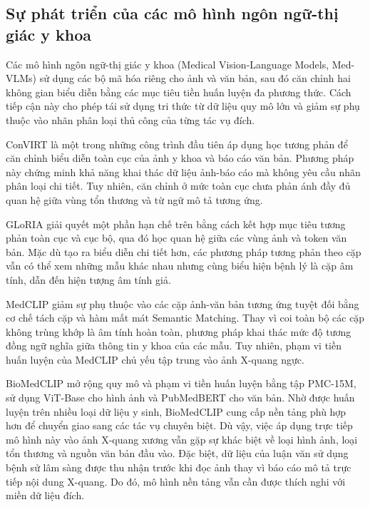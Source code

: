\subsection{Sự phát triển của các mô hình ngôn ngữ-thị giác y khoa}
\label{subsec:med_vlm_progress}

Các mô hình ngôn ngữ-thị giác y khoa (Medical Vision-Language Models, Med-VLMs) sử dụng các bộ mã hóa riêng cho ảnh và văn bản, sau đó căn chỉnh hai không gian biểu diễn bằng các mục tiêu tiền huấn luyện đa phương thức. Cách tiếp cận này cho phép tái sử dụng tri thức từ dữ liệu quy mô lớn và giảm sự phụ thuộc vào nhãn phân loại thủ công của từng tác vụ đích.

ConVIRT \cite{ConVIRT} là một trong những công trình đầu tiên áp dụng học tương phản để căn chỉnh biểu diễn toàn cục của ảnh y khoa và báo cáo văn bản. Phương pháp này chứng minh khả năng khai thác dữ liệu ảnh-báo cáo mà không yêu cầu nhãn phân loại chi tiết. Tuy nhiên, căn chỉnh ở mức toàn cục chưa phản ánh đầy đủ quan hệ giữa vùng tổn thương và từ ngữ mô tả tương ứng.

GLoRIA \cite{GLoRIA} giải quyết một phần hạn chế trên bằng cách kết hợp mục tiêu tương phản toàn cục và cục bộ, qua đó học quan hệ giữa các vùng ảnh và token văn bản. Mặc dù tạo ra biểu diễn chi tiết hơn, các phương pháp tương phản theo cặp vẫn có thể xem những mẫu khác nhau nhưng cùng biểu hiện bệnh lý là cặp âm tính, dẫn đến hiện tượng âm tính giả.

MedCLIP \cite{MedCLIP} giảm sự phụ thuộc vào các cặp ảnh-văn bản tương ứng tuyệt đối bằng cơ chế tách cặp và hàm mất mát Semantic Matching. Thay vì coi toàn bộ các cặp không trùng khớp là âm tính hoàn toàn, phương pháp khai thác mức độ tương đồng ngữ nghĩa giữa thông tin y khoa của các mẫu. Tuy nhiên, phạm vi tiền huấn luyện của MedCLIP chủ yếu tập trung vào ảnh X-quang ngực.

BioMedCLIP \cite{BiomedCLIP} mở rộng quy mô và phạm vi tiền huấn luyện bằng tập PMC-15M, sử dụng ViT-Base cho hình ảnh và PubMedBERT cho văn bản. Nhờ được huấn luyện trên nhiều loại dữ liệu y sinh, BioMedCLIP cung cấp nền tảng phù hợp hơn để chuyển giao sang các tác vụ chuyên biệt. Dù vậy, việc áp dụng trực tiếp mô hình này vào ảnh X-quang xương vẫn gặp sự khác biệt về loại hình ảnh, loại tổn thương và nguồn văn bản đầu vào. Đặc biệt, dữ liệu của luận văn sử dụng bệnh sử lâm sàng được thu nhận trước khi đọc ảnh thay vì báo cáo mô tả trực tiếp nội dung X-quang. Do đó, mô hình nền tảng vẫn cần được thích nghi với miền dữ liệu đích.


